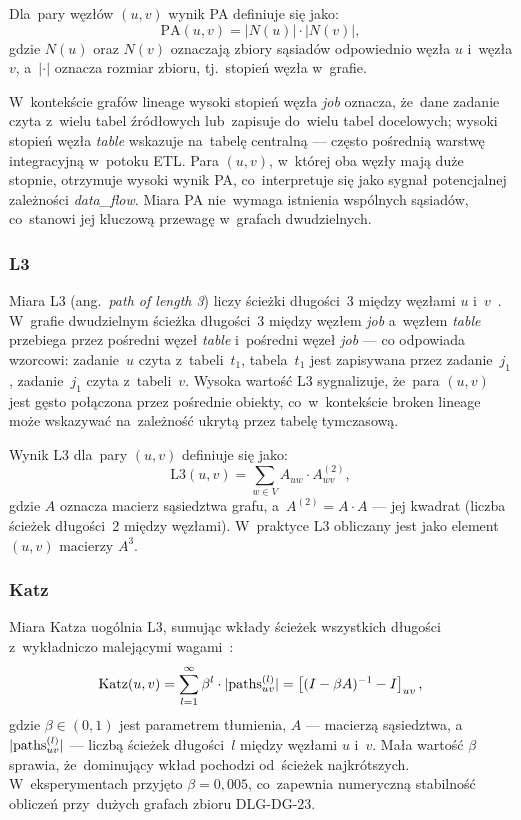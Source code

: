 Dla~pary węzłów $(u, v)$ wynik PA definiuje się jako:
%
\[
  \mathrm{PA}(u, v) = |N(u)| \cdot |N(v)|,
\]
%
gdzie $N(u)$ oraz $N(v)$ oznaczają zbiory sąsiadów odpowiednio węzła $u$
i~węzła $v$, a~$|\cdot|$ oznacza rozmiar zbioru, tj.\ stopień węzła w~grafie.

W~kontekście grafów lineage wysoki stopień węzła \emph{job} oznacza,
że~dane zadanie czyta z~wielu tabel źródłowych lub~zapisuje do~wielu
tabel docelowych; wysoki stopień węzła \emph{table} wskazuje na~tabelę
centralną — często pośrednią warstwę integracyjną w~potoku ETL.
Para $(u, v)$, w~której oba węzły mają duże stopnie, otrzymuje wysoki
wynik PA, co~interpretuje się jako sygnał potencjalnej zależności
\emph{data\_flow}. Miara PA nie~wymaga istnienia wspólnych sąsiadów,
co~stanowi jej kluczową przewagę w~grafach dwudzielnych.

\subsubsection{L3}

Miara L3 (ang.\ \emph{path of length 3}) liczy ścieżki długości~3
między węzłami $u$ i~$v$~\cite{LibenNowell2007}. W~grafie dwudzielnym
ścieżka długości~3 między węzłem \emph{job} a~węzłem \emph{table}
przebiega przez pośredni węzeł \emph{table} i~pośredni węzeł \emph{job}
— co odpowiada wzorcowi: zadanie~$u$ czyta z~tabeli~$t_1$, tabela~$t_1$
jest zapisywana przez zadanie~$j_1$, zadanie~$j_1$ czyta z~tabeli~$v$.
Wysoka wartość L3 sygnalizuje, że~para $(u, v)$ jest gęsto połączona
przez pośrednie obiekty, co~w~kontekście broken lineage może wskazywać
na~zależność ukrytą przez tabelę tymczasową.

Wynik L3 dla~pary $(u, v)$ definiuje się jako:
%
\[
  \mathrm{L3}(u, v) = \sum_{w \in V} A_{uw} \cdot A_{wv}^{(2)},
\]
%
gdzie $A$ oznacza macierz sąsiedztwa grafu, a~$A^{(2)} = A \cdot A$
— jej kwadrat (liczba ścieżek długości~2 między węzłami).
W~praktyce L3 obliczany jest jako element $(u,v)$ macierzy $A^3$.

\subsubsection{Katz}

Miara Katza uogólnia L3, sumując wkłady ścieżek wszystkich długości
z~wykładniczo malejącymi wagami~\cite{LibenNowell2007}:
%
\[
  \mathrm{Katz}(u, v) = \sum_{l=1}^{\infty} \beta^{l} \cdot |{\rm paths}_{uv}^{(l)}|
  = \left[(I - \beta A)^{-1} - I\right]_{uv},
\]
%
gdzie $\beta \in (0, 1)$ jest parametrem tłumienia, $A$ — macierzą
sąsiedztwa, a~$|{\rm paths}_{uv}^{(l)}|$ — liczbą ścieżek długości~$l$
między węzłami $u$ i~$v$. Mała wartość $\beta$ sprawia, że~dominujący
wkład pochodzi od~ścieżek najkrótszych. W~eksperymentach przyjęto
$\beta = 0{,}005$, co~zapewnia numeryczną stabilność obliczeń
przy~dużych grafach zbioru DLG-DG-23.

